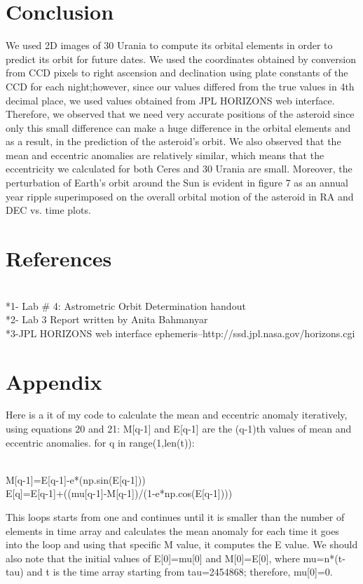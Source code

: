 \documentclass[letterpaper,12pt]{article}
\begin{document}
\section{Conclusion}
\label{sec:conclusion}
We used 2D images of 30 Urania to compute its orbital elements in order to predict its orbit for future dates. We used the coordinates obtained by conversion from CCD pixels to right ascension and declination using plate constants of the CCD for each night;however, since our values differed from the true values in 4th decimal place, we used values obtained from JPL HORIZONS web interface. Therefore, we observed that we need very accurate positions of the asteroid since only this small difference can make a huge difference in the orbital elements and as a result, in the prediction of the asteroid's orbit. We also observed that the mean and eccentric anomalies are relatively similar, which means that the eccentricity we calculated for both Ceres and 30 Urania are small. Moreover, the perturbation of Earth's orbit around the Sun is evident in figure 7 as an annual year ripple superimposed on the overall orbital motion of the asteroid in RA and DEC vs. time plots.

\section{References}
\label{sec:references}
\\*1- Lab # 4: Astrometric Orbit Determination handout
\\*2- Lab 3 Report written by Anita Bahmanyar
\\*3-JPL HORIZONS web interface ephemeris--http://ssd.jpl.nasa.gov/horizons.cgi

\section{Appendix}
\label{sec:appendix}
Here is a it of my code to calculate the mean and eccentric anomaly iteratively, using equations 20 and  21:
M[q-1] and E[q-1] are the (q-1)th values of mean and eccentric anomalies. 
for q in range(1,len(t)):

\\       M[q-1]=E[q-1]-e*(np.sin(E[q-1]))
\\       E[q]=E[q-1]+((mu[q-1]-M[q-1])/(1-e*np.cos(E[q-1]))) 
   
This loops starts from one and continues until it is smaller than the number of elements in time array and calculates the mean anomaly for each time it goes into the loop and using that specific M value, it computes the E value. We should also note that the initial values of E[0]=mu[0] and M[0]=E[0], where mu=n*(t-tau) and t is the time array starting from tau=2454868; therefore, mu[0]=0.
    
\end{document}
